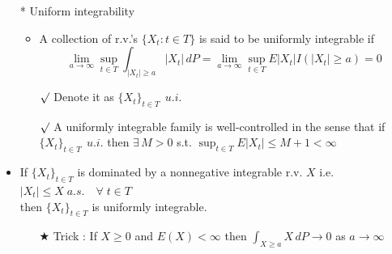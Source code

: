 \documentclass[12pt, A4]{article}
\newcommand{\rmk}{$\surd$}
\newcommand{\trick}{$\bigstar$}
\newcommand{\exist}{\exists\,}
\begin{document}
\begin{itemize}
\begin{itemize}
\begin{itemize}
		\end{itemize} 
	\end{itemize}
	\item[*] Uniform integrability
	\begin{itemize}
		\item A collection of r.v.'s $\{X_t : t\in T\}$ is said to be uniformly integrable if 
		$$
			\lim_{a\rightarrow \infty} \sup_{t\in T} \int_{|X_t|\geq a}|X_t|\,dP = \lim_{a\rightarrow \infty} \sup_{t\in T} E|X_t|I(|X_t|\geq a) =0
		$$
		\item[\rmk] Denote it as $\{X_t\}_{t\in T}\;\,u.i.$
		\item[\rmk] A uniformly integrable family is well-controlled in the sense that if $\{X_t\}_{t\in T}\;\,u.i.$ then $\exist M>0$ s.t. $\sup_{t\in T}E|X_t|\leq M+1<\infty$
	\end{itemize}
	\item If $\{X_t\}_{t\in T}$ is dominated by a nonnegative integrable r.v. $X$ \;i.e. $|X_t|\leq X\;a.s.\quad \forall\;t\in T$ \\ then $\{X_t\}_{t\in T}$ is uniformly integrable.
	\begin{itemize}
		\item[\trick] Trick : If $X\geq 0$ and $E(X)<\infty$ then $\int_{X\geq a} X\,dP\rightarrow 0$ as $a\rightarrow \infty$
	\end{itemize} 
\end{itemize}
\end{document}
